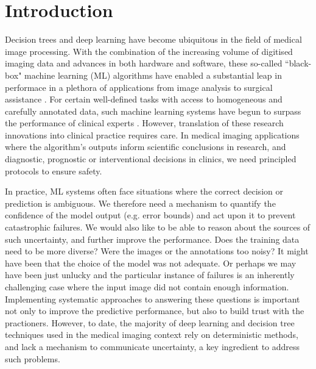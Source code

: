 \chapter{Introduction}
\label{chapter:intro}

Decision trees \cite{breiman2001random} and deep learning \cite{lecun2015deep} have become ubiquitous in the field of medical image processing. With the combination of the increasing volume of digitised imaging data and advances in both hardware and software,  these so-called ``black-box" machine learning (ML) algorithms have enabled a substantial leap in performace in a plethora of applications from image analysis to surgical assistance \cite{criminisi2013decision,litjens2017survey}. For certain well-defined tasks with access to homogeneous and carefully annotated data, such machine learning systems have begun to surpass the performance of clinical experts \cite{esteva2017dermatologist,gulshan2016development,rajpurkar2017chexnet,wu2019deep}. However, translation of these research innovations into clinical practice requires care. In medical imaging applications where the algorithm's outputs inform scientific conclusions in research, and diagnostic, prognostic or interventional decisions in clinics, we need principled protocols to ensure safety. 

In practice, ML systems often face situations where the correct decision or prediction is ambiguous. We therefore need a mechanism to quantify the confidence of the model output (e.g. error bounds) and act upon it to prevent catastrophic failures. We would also like to be able to reason about the sources of such uncertainty, and further improve the performance. Does the training data need to be more diverse? Were the images or the annotations too noisy? It might have been that the choice of the model was not adequate. Or perhaps we may have been just unlucky and the particular instance of failures is an inherently challenging case where the input image did not contain enough information. Implementing systematic approaches to answering these questions is important not only to improve the predictive performance, but also to build trust with the practioners. However, to date, the majority of deep learning and decision tree techniques used in the medical imaging context rely on deterministic methods, and lack a mechanism to communicate uncertainty, a key ingredient to address such problems. 

